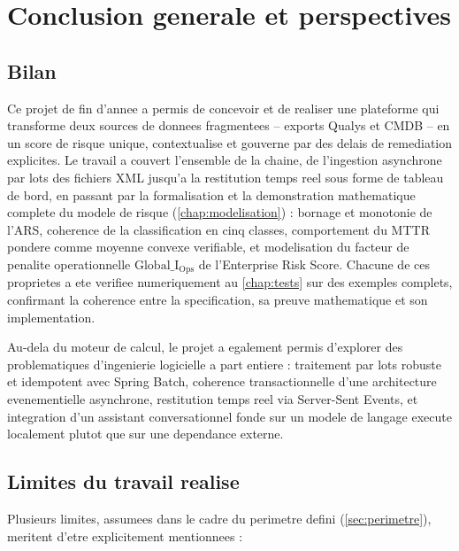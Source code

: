 \chapter*{Conclusion generale et perspectives}

\section*{Bilan}

Ce projet de fin d'annee a permis de concevoir et de realiser une plateforme
qui transforme deux sources de donnees fragmentees -- exports Qualys et
CMDB -- en un score de risque unique, contextualise et gouverne par des delais de
remediation explicites. Le travail a couvert l'ensemble de la chaine, de l'ingestion
asynchrone par lots des fichiers XML jusqu'a la restitution temps reel sous forme de
tableau de bord, en passant par la formalisation et la demonstration mathematique
complete du modele de risque (\cref{chap:modelisation}) : bornage et monotonie de
l'ARS, coherence de la classification en cinq classes, comportement du MTTR pondere
comme moyenne convexe verifiable, et modelisation du facteur de penalite operationnelle
$\mathrm{Global\_I_{Ops}}$ de l'Enterprise Risk Score. Chacune de ces proprietes a
ete verifiee numeriquement au \cref{chap:tests} sur des exemples complets, confirmant
la coherence entre la specification, sa preuve mathematique et son implementation.

Au-dela du moteur de calcul, le projet a egalement permis d'explorer des
problematiques d'ingenierie logicielle a part entiere : traitement par lots
robuste et idempotent avec Spring Batch, coherence transactionnelle d'une
architecture evenementielle asynchrone, restitution temps reel via Server-Sent
Events, et integration d'un assistant conversationnel fonde sur un modele de langage
execute localement plutot que sur une dependance externe.

\section*{Limites du travail realise}

Plusieurs limites, assumees dans le cadre du perimetre defini
(\cref{sec:perimetre}), meritent d'etre explicitement mentionnees :

